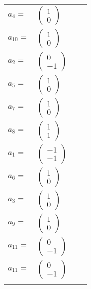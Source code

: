 \documentclass[1p]{elsarticle_modified}
\theoremstyle{definition}
\begin{document}
\begin{tabular}{m{7pt} m{180pt} m{7pt} m{180pt} }
\flushright $a_{4}=$&$\begin{pmatrix}1\\0\end{pmatrix}$ \\
\flushright $a_{10}=$&$\begin{pmatrix}1\\0\end{pmatrix}$ \\
\flushright $a_{2}=$&$\begin{pmatrix}0\\-1\end{pmatrix}$ \\
\flushright $a_{5}=$&$\begin{pmatrix}1\\0\end{pmatrix}$ \\
\flushright $a_{7}=$&$\begin{pmatrix}1\\0\end{pmatrix}$ \\
\flushright $a_{8}=$&$\begin{pmatrix}1\\1\end{pmatrix}$ \\
\flushright $a_{1}=$&$\begin{pmatrix}-1\\-1\end{pmatrix}$ \\
\flushright $a_{6}=$&$\begin{pmatrix}1\\0\end{pmatrix}$ \\
\flushright $a_{3}=$&$\begin{pmatrix}1\\0\end{pmatrix}$ \\
\flushright $a_{9}=$&$\begin{pmatrix}1\\0\end{pmatrix}$ \\
\flushright $a_{11}=$&$\begin{pmatrix}0\\-1\end{pmatrix}$\\ \flushright $a_{11}=$&$\begin{pmatrix}0\\-1\end{pmatrix}$\\&\end{tabular}
\end{document}
